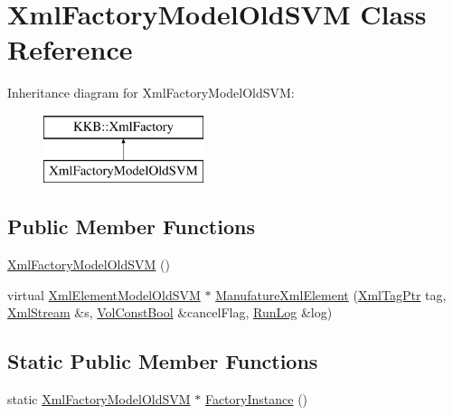 \hypertarget{class_xml_factory_model_old_s_v_m}{}\section{Xml\+Factory\+Model\+Old\+S\+VM Class Reference}
\label{class_xml_factory_model_old_s_v_m}
Inheritance diagram for Xml\+Factory\+Model\+Old\+S\+VM\+:\begin{figure}[H]
\begin{center}
\leavevmode
\includegraphics[height=2.000000cm]{class_xml_factory_model_old_s_v_m}
\end{center}
\end{figure}
\subsection*{Public Member Functions}
\begin{DoxyCompactItemize}
\item 
\hyperlink{class_xml_factory_model_old_s_v_m_a1b90f2f3b1b467264bc225c3cc3c7250}{Xml\+Factory\+Model\+Old\+S\+VM} ()
\item 
virtual \hyperlink{namespace_k_k_m_l_l_a7e90a26f4dcf446a8c305201aa2b4432}{Xml\+Element\+Model\+Old\+S\+VM} $\ast$ \hyperlink{class_xml_factory_model_old_s_v_m_a2edb7ad89b26e9b436159f06e177e223}{Manufature\+Xml\+Element} (\hyperlink{namespace_k_k_b_a9253a3ea8a5da18ca82be4ca2b390ef0}{Xml\+Tag\+Ptr} tag, \hyperlink{class_k_k_b_1_1_xml_stream}{Xml\+Stream} \&s, \hyperlink{namespace_k_k_b_a7d390f568e2831fb76b86b56c87bf92f}{Vol\+Const\+Bool} \&cancel\+Flag, \hyperlink{class_k_k_b_1_1_run_log}{Run\+Log} \&log)
\end{DoxyCompactItemize}
\subsection*{Static Public Member Functions}
\begin{DoxyCompactItemize}
\item 
static \hyperlink{class_xml_factory_model_old_s_v_m}{Xml\+Factory\+Model\+Old\+S\+VM} $\ast$ \hyperlink{class_xml_factory_model_old_s_v_m_a12d4843683887c8419c46bda5645216b}{Factory\+Instance} ()
\end{DoxyCompactItemize}
